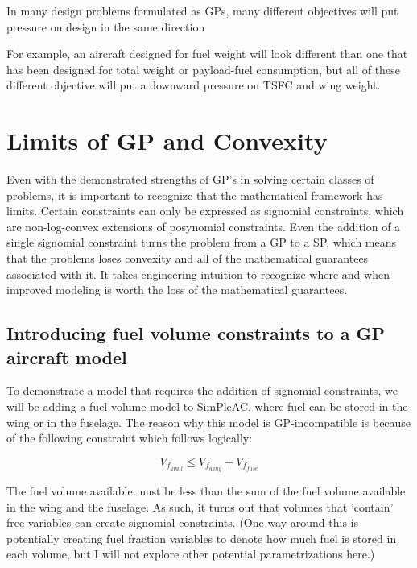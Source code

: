 In many design problems
formulated as \gls{GP}s, many different objectives will put pressure on design 
in the same direction

For example, an aircraft designed for fuel weight will look different than one 
that has been designed for total weight or payload-fuel consumption, but all of
these different objective will put a downward pressure on TSFC and wing weight. 

\section{Limits of GP and Convexity} \label{sec:GPLimits}

Even with the demonstrated strengths of \gls{GP}'s in solving certain classes of 
problems, it is important to recognize that the mathematical framework has limits. 
Certain constraints can only be expressed as signomial constraints, which are 
non-log-convex extensions of posynomial constraints. Even the addition of a single 
signomial constraint turns the problem from a \gls{GP} to a \gls{SP}, which means 
that the problems loses convexity and all of the mathematical guarantees associated with it. 
It takes engineering intuition to recognize where and when improved modeling is worth
the loss of the mathematical guarantees.

\subsection{Introducing fuel volume constraints to a GP aircraft model}

To demonstrate a model that requires the addition of signomial constraints, we will 
be adding a fuel volume model to SimPleAC, where fuel can be stored in the wing or
in the fuselage. The reason why this model is GP-incompatible is because of the 
following constraint which follows logically:

\begin{equation}
	V_{f_{avail}} \leq V_{f_{wing}} + V_{f_{fuse}}
	\label{vfavail}
\end{equation}

The fuel volume available must be less than the sum of the fuel volume available in the
wing and the fuselage. As such, it turns out that volumes that 'contain' free variables
can create signomial constraints. (One way around this is potentially creating fuel
fraction variables to denote how much fuel is stored in each volume, but I will not 
explore other potential parametrizations here.)

